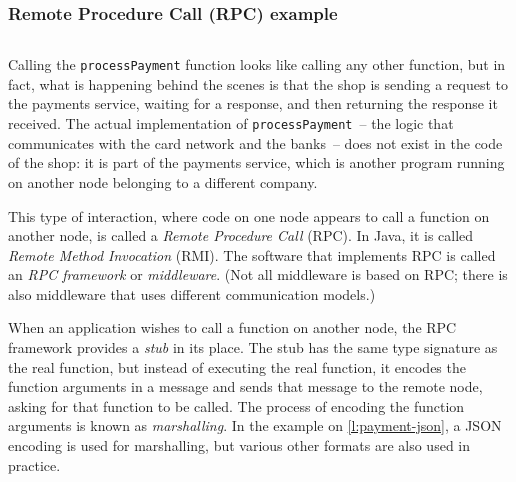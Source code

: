 \begin{frame}
    \label{s:payment-rpc}
    \frametitle{Remote Procedure Call (RPC) example}
    \inputminted{java}{code/payment-rpc.java}
\end{frame}
\label{l:payment-rpc}

Calling the \verb|processPayment| function looks like calling any other function, but in fact, what is happening behind the scenes is that the shop is sending a request to the payments service, waiting for a response, and then returning the response it received.
The actual implementation of \verb|processPayment|~-- the logic that communicates with the card network and the banks~-- does not exist in the code of the shop: it is part of the payments service, which is another program running on another node belonging to a different company.

This type of interaction, where code on one node appears to call a function on another node, is called a \emph{Remote Procedure Call} (RPC).
In Java, it is called \emph{Remote Method Invocation} (RMI).
The software that implements RPC is called an \emph{RPC framework} or \emph{middleware}.
(Not all middleware is based on RPC; there is also middleware that uses different communication models.)

When an application wishes to call a function on another node, the RPC framework provides a \emph{stub} in its place.
The stub has the same type signature as the real function, but instead of executing the real function, it encodes the function arguments in a message and sends that message to the remote node, asking for that function to be called.
The process of encoding the function arguments is known as \emph{marshalling}.
In the example on \autoref{l:payment-json}, a JSON encoding is used for marshalling, but various other formats are also used in practice.


